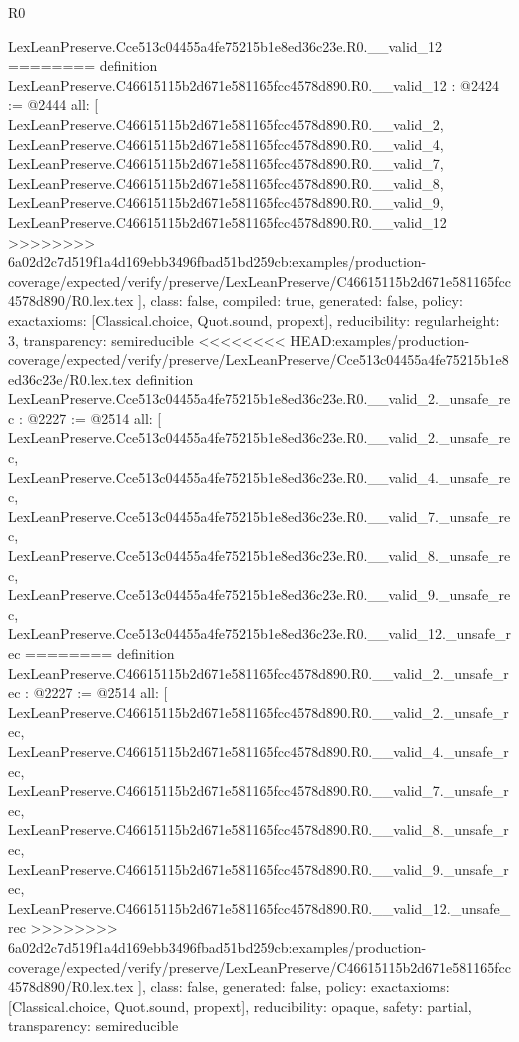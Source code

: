 \begin{lexlean}{R0}
\begin{coremodule}
{{{{{{{{{{{{{{{{{{{{{{{{{{{{{{{{{{{{{{{{{{{{{{{{{    LexLeanPreserve.Cce513c04455a4fe75215b1e8ed36c23e.R0.__valid_12
========
definition LexLeanPreserve.C46615115b2d671e581165fcc4578d890.R0.__valid_12 : @2424 := @2444 {
  all: [
    LexLeanPreserve.C46615115b2d671e581165fcc4578d890.R0.__valid_2,
    LexLeanPreserve.C46615115b2d671e581165fcc4578d890.R0.__valid_4,
    LexLeanPreserve.C46615115b2d671e581165fcc4578d890.R0.__valid_7,
    LexLeanPreserve.C46615115b2d671e581165fcc4578d890.R0.__valid_8,
    LexLeanPreserve.C46615115b2d671e581165fcc4578d890.R0.__valid_9,
    LexLeanPreserve.C46615115b2d671e581165fcc4578d890.R0.__valid_12
>>>>>>>> 6a02d2c7d519f1a4d169ebb3496fbad51bd259cb:examples/production-coverage/expected/verify/preserve/LexLeanPreserve/C46615115b2d671e581165fcc4578d890/R0.lex.tex
  ],
  class: false,
  compiled: true,
  generated: false,
  policy: exact{axioms: [Classical.choice, Quot.sound, propext]},
  reducibility: regular{height: 3},
  transparency: semireducible
}
<<<<<<<< HEAD:examples/production-coverage/expected/verify/preserve/LexLeanPreserve/Cce513c04455a4fe75215b1e8ed36c23e/R0.lex.tex
definition LexLeanPreserve.Cce513c04455a4fe75215b1e8ed36c23e.R0.__valid_2._unsafe_rec : @2227 := @2514 {
  all: [
    LexLeanPreserve.Cce513c04455a4fe75215b1e8ed36c23e.R0.__valid_2._unsafe_rec,
    LexLeanPreserve.Cce513c04455a4fe75215b1e8ed36c23e.R0.__valid_4._unsafe_rec,
    LexLeanPreserve.Cce513c04455a4fe75215b1e8ed36c23e.R0.__valid_7._unsafe_rec,
    LexLeanPreserve.Cce513c04455a4fe75215b1e8ed36c23e.R0.__valid_8._unsafe_rec,
    LexLeanPreserve.Cce513c04455a4fe75215b1e8ed36c23e.R0.__valid_9._unsafe_rec,
    LexLeanPreserve.Cce513c04455a4fe75215b1e8ed36c23e.R0.__valid_12._unsafe_rec
========
definition LexLeanPreserve.C46615115b2d671e581165fcc4578d890.R0.__valid_2._unsafe_rec : @2227 := @2514 {
  all: [
    LexLeanPreserve.C46615115b2d671e581165fcc4578d890.R0.__valid_2._unsafe_rec,
    LexLeanPreserve.C46615115b2d671e581165fcc4578d890.R0.__valid_4._unsafe_rec,
    LexLeanPreserve.C46615115b2d671e581165fcc4578d890.R0.__valid_7._unsafe_rec,
    LexLeanPreserve.C46615115b2d671e581165fcc4578d890.R0.__valid_8._unsafe_rec,
    LexLeanPreserve.C46615115b2d671e581165fcc4578d890.R0.__valid_9._unsafe_rec,
    LexLeanPreserve.C46615115b2d671e581165fcc4578d890.R0.__valid_12._unsafe_rec
>>>>>>>> 6a02d2c7d519f1a4d169ebb3496fbad51bd259cb:examples/production-coverage/expected/verify/preserve/LexLeanPreserve/C46615115b2d671e581165fcc4578d890/R0.lex.tex
  ],
  class: false,
  generated: false,
  policy: exact{axioms: [Classical.choice, Quot.sound, propext]},
  reducibility: opaque{},
  safety: partial,
  transparency: semireducible
}}}}}}}}}}}}}}}}}}}}}}}}}}}}}}}}}}}}}}}}}}}}}}}}}}}
\end{coremodule}
\end{lexlean}
